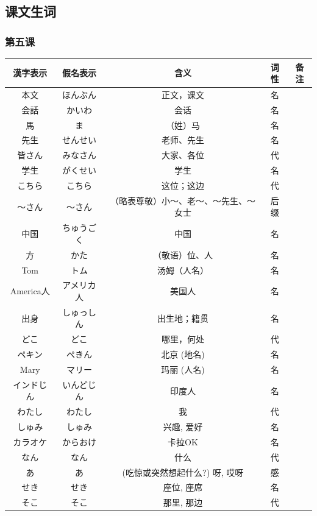 \subsection{课文生词}

\subsubsection{第五课}
\begin{longtable}{|c|c|c|c|c|}
    \hline
漢字表示 & 假名表示  & 含义 & 词性 & 备注 \\ \hline\hline        
本文 & ほんぶん  & 正文，课文 & 名 &  \\ \hline
会話 & かいわ  & 会话 & 名 & \\ \hline
馬 & ま  & （姓）马 & 名 & \\ \hline
先生 & せんせい  & 老师、先生 & 名 & \\ \hline
皆さん & みなさん  & 大家、各位 & 代 & \\ \hline
学生 & がくせい  & 学生 & 名 & \\ \hline
こちら & こちら  & 这位；这边 & 代 & \\ \hline
～さん & ～さん  & （略表尊敬）小～、老～、～先生、～女士 & 后缀 & \\ \hline
中国 & ちゅうごく  & 中国 & 名 & \\ \hline
方 & かた  & （敬语）位、人 & 名 & \\ \hline
Tom & トム  & 汤姆（人名） & 名 & \\ \hline
America人 & アメリカ人 &  美国人 & 名 & \\ \hline
出身 & しゅっしん  & 出生地；籍贯 & 名 & \\ \hline
どこ & どこ  & 哪里，何处 & 代 & \\ \hline
ペキン & ぺきん  & 北京 (地名) & 名 & \\ \hline
Mary & マリー  & 玛丽 (人名) & 名 & \\ \hline
インドじん & いんどじん  & 印度人 & 名 & \\ \hline
わたし & わたし  & 我 & 代 & \\ \hline 
しゅみ & しゅみ  & 兴趣, 爱好 & 名  &\\ \hline
カラオケ & からおけ  & 卡拉OK & 名 & \\ \hline
なん & なん  & 什么 & 代 & \\ \hline
あ & あ  & (吃惊或突然想起什么?) 呀, 哎呀 & 感 & \\ \hline
せき & せき  & 座位, 座席 & 名 & \\ \hline
そこ & そこ  & 那里, 那边 & 代 & \\ \hline

\end{longtable}
